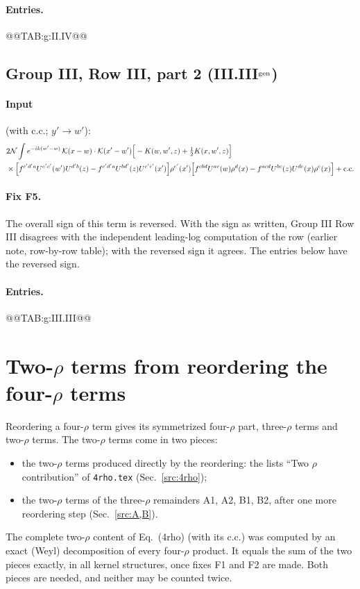 \documentclass[10pt]{article}
\numberwithin{equation}{section}
\newcommand{\KK}{\mathcal K}
\newcommand{\NN}{\mathcal N}
\begin{document}
\paragraph{Entries.}
@@TAB:g:II.IV@@

\subsection{Group III, Row III, part 2 \texorpdfstring{(III.III$^{\rm gen}$)}{}}\label{src:g:III.III}
\paragraph{Input} (with c.c.; $y'\to w'$):
\begin{align}
&2\NN\int e^{-ik(w'-w)}\,\KK(x-w)\cdot\KK(x'-w')\Big[-K(w,w',z)+\tfrac12K(x,w',z)\Big]\notag\\
&\times\Big[f^{c'd'a}U^{e'c'}(w')U^{d'b}(z)-f^{c'd'a}U^{bd'}(z)U^{c'e'}(x')\Big]\rho^{e'}(x')\Big[f^{cbd}U^{ac}(w)\rho^d(x)-f^{acd}U^{bc}(z)U^{de}(x)\rho^e(x)\Big]+{\rm c.c.}
\end{align}
\paragraph{Fix F5.} The overall sign of this term is reversed. With the sign as written, Group III Row III disagrees with the independent leading-log computation of the row (earlier note, row-by-row table); with the reversed sign it agrees. The entries below have the reversed sign.
\paragraph{Entries.}
@@TAB:g:III.III@@

\section{Two-\texorpdfstring{$\rho$}{rho} terms from reordering the four-\texorpdfstring{$\rho$}{rho} terms}\label{sec:four}
Reordering a four-$\rho$ term gives its symmetrized four-$\rho$ part, three-$\rho$ terms and two-$\rho$ terms. The two-$\rho$ terms come in two pieces:
\begin{itemize}
\item the two-$\rho$ terms produced directly by the reordering: the lists ``Two $\rho$ contribution'' of \texttt{4rho.tex} (Sec.~\ref{src:4rho});
\item the two-$\rho$ terms of the three-$\rho$ remainders A1, A2, B1, B2, after one more reordering step (Sec.~\ref{src:A,B}).
\end{itemize}
The complete two-$\rho$ content of Eq.~(4rho) (with its c.c.) was computed by an exact (Weyl) decomposition of every four-$\rho$ product. It equals the sum of the two pieces exactly, in all kernel structures, once fixes F1 and F2 are made. Both pieces are needed, and neither may be counted twice.
\end{document}
